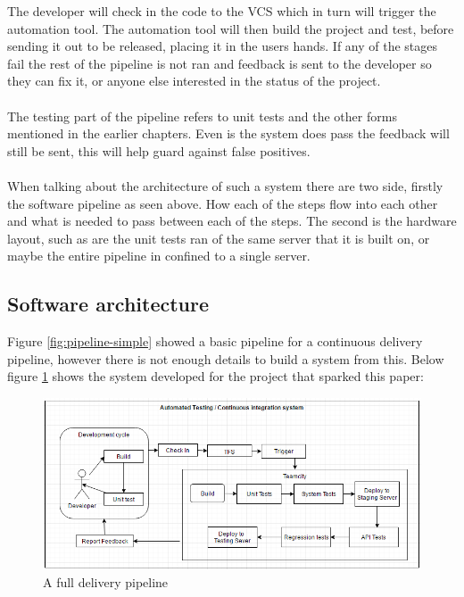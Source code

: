 The developer will check in the code to the VCS which in turn will trigger the automation tool. The automation tool will then build the project and test, before sending it out to be released, placing it in the users hands. If any of the stages fail the rest of the pipeline is not ran and feedback is sent to the developer so they can fix it, or anyone else interested in the status of the project. 
\\\\
The testing part of the pipeline refers to unit tests and the other forms mentioned in the earlier chapters. Even is the system does pass the feedback will still be sent, this will help guard against false positives.
\\\\
When talking about the architecture of such a system there are two side, firstly the software pipeline as seen above. How each of the steps flow into each other and what is needed to pass between each of the steps. The second is the hardware layout,  such as are the unit tests ran of the same server that it is built on, or maybe the entire pipeline in confined to a single server.

\subsection{Software architecture}
\label{sec:testing}

Figure \ref{fig:pipeline-simple} showed a basic pipeline for a continuous delivery pipeline, however there is not enough details to build a system from this. Below figure \ref{fig:bsipipeline} shows the system developed for the project that sparked this paper:

\begin{figure}[H]
	\centering
	\includegraphics[scale=0.6]{images/bsipipleine.png}
	\caption{A full delivery pipeline}
	\label{fig:bsipipeline}
\end{figure}

